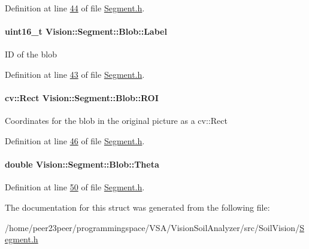 Definition at line \hyperlink{_segment_8h_source_l00044}{44} of file \hyperlink{_segment_8h_source}{Segment.\+h}.

\hypertarget{struct_vision_1_1_segment_1_1_blob_aaa4c2a0d3f0c920fb8b59417dd54f82b}{}
\paragraph[{Label}]{\setlength{\rightskip}{0pt plus 5cm}uint16\+\_\+t Vision\+::\+Segment\+::\+Blob\+::\+Label}\label{struct_vision_1_1_segment_1_1_blob_aaa4c2a0d3f0c920fb8b59417dd54f82b}
I\+D of the blob 

Definition at line \hyperlink{_segment_8h_source_l00043}{43} of file \hyperlink{_segment_8h_source}{Segment.\+h}.

\hypertarget{struct_vision_1_1_segment_1_1_blob_aceb3e938bb4489c08edd9324fdee7465}{}
\paragraph[{R\+O\+I}]{\setlength{\rightskip}{0pt plus 5cm}cv\+::\+Rect Vision\+::\+Segment\+::\+Blob\+::\+R\+O\+I}\label{struct_vision_1_1_segment_1_1_blob_aceb3e938bb4489c08edd9324fdee7465}
Coordinates for the blob in the original picture as a cv\+::\+Rect 

Definition at line \hyperlink{_segment_8h_source_l00046}{46} of file \hyperlink{_segment_8h_source}{Segment.\+h}.

\hypertarget{struct_vision_1_1_segment_1_1_blob_a1a48ef74a8b707aa02bb93fd5f75a080}{}
\paragraph[{Theta}]{\setlength{\rightskip}{0pt plus 5cm}double Vision\+::\+Segment\+::\+Blob\+::\+Theta}\label{struct_vision_1_1_segment_1_1_blob_a1a48ef74a8b707aa02bb93fd5f75a080}


Definition at line \hyperlink{_segment_8h_source_l00050}{50} of file \hyperlink{_segment_8h_source}{Segment.\+h}.



The documentation for this struct was generated from the following file\+:\begin{DoxyCompactItemize}
\item 
/home/peer23peer/programmingspace/\+V\+S\+A/\+Vision\+Soil\+Analyzer/src/\+Soil\+Vision/\hyperlink{_segment_8h}{Segment.\+h}\end{DoxyCompactItemize}
